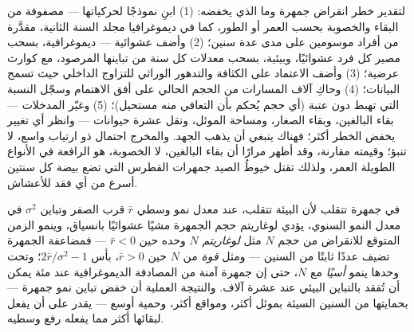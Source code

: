 \begin{method}\label{met:b3:conservation-biology:pva}
لتقدير خطر انقراض جمهرة وما الذي يخفضه:
(1) ابنِ نموذجًا لحركياتها --- مصفوفة من البقاء والخصوبة بحسب
العمر أو الطور، كما في ديموغرافيا مجلد السنة الثانية، مقدَّرة
من أفراد موسومين على مدى عدة سنين؛ (2) وأضف عشوائية ---
ديموغرافية، بسحب مصير كل فرد عشوائيًا،
وبيئية، بسحب معدلات كل سنة من تباينها
المرصود، مع كوارث عرضية؛ (3) وأضف الاعتماد على الكثافة
والتدهور الوراثي للتزاوج الداخلي حيث تسمح البيانات؛ (4) وحاكِ
آلاف المسارات من الحجم الحالي على أفق
الاهتمام وسجّل النسبة التي تهبط دون عتبة \emph{}
(أي حجم يُحكم بأن التعافي منه مستحيل)؛ (5) وغيّر
المدخلات --- بقاء البالغين، وبقاء الصغار، ومساحة الموئل،
ونقل عشرة حيوانات --- وانظر أي تغيير يخفض الخطر أكثر؛
فهناك ينبغي أن يذهب الجهد. والمخرج احتمال ذو
ارتياب واسع، لا تنبؤ؛ وقيمته مقارنة، وقد
أظهر مرارًا أن بقاء البالغين، لا الخصوبة، هو الرافعة
في الأنواع الطويلة العمر، ولذلك تقتل خيوطُ الصيد جمهرات
القطرس التي تضع بيضة كل سنتين أسرع من أي فقد
للأعشاش.
\end{method}

\begin{proposition}\label{prop:b3:conservation-biology:time}
في جمهرة تتقلب لأن البيئة تتقلب، عند
معدل نمو وسطي $\bar r$ قرب الصفر وتباين $\sigma^{2}$ في
معدل النمو السنوي، يؤدي لوغاريتم حجم الجمهرة مشيًا عشوائيًا
بانسياق، وينمو الزمن المتوقع للانقراض من حجم $N$
مثل \emph{لوغاريتم} $N$ وحده حين $\bar r < 0$ --- فمضاعفة
الجمهرة تضيف عددًا ثابتًا من السنين --- ومثل \emph{قوة} من
$N$ حين $\bar r > 0$، بأس $2\bar r/\sigma^{2} - 1$؛ وتحت
 وحدها ينمو \emph{أسيًا} مع
$N$، حتى إن جمهرة آمنة من المصادفة الديموغرافية عند مئة
يمكن أن تُفقد بالتباين البيئي عند عشرة آلاف. والنتيجة
العملية أن خفض تباين نمو جمهرة --- بحمايتها
من السنين السيئة بموئل أكثر، ومواقع أكثر، وحمية أوسع ---
يقدر على أن يفعل لبقائها أكثر مما يفعله رفع
وسطيه.
\end{proposition}
\admitted

